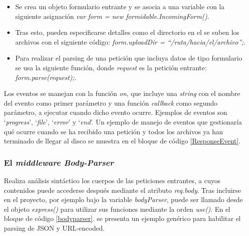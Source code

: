 \begin{itemize}
\item Se crea un objeto formulario entrante y se asocia a una variable con la siguiente asignación \emph{var form = new formidable.IncomingForm()}.
\item Tras esto, pueden especificarse detalles como el directorio en el se suben los archivos con el siguiente código:  \emph{form.uploadDir = ``/ruta/hacia/el/archivo'';}. 
\item Para realizar el parsing de una petición que incluya datos de tipo formulario se usa la siguiente función, donde \emph{request} es la petición entrante: \emph{form.parse(request);}.
\end{itemize}

Los eventos se manejan con la función \emph{on}, que incluye una \emph{string} con el nombre del evento como primer parámetro y una función \emph{callback} como segundo parámetro, a ejecutar cuando dicho evento ocurre. Ejemplos de eventos son ‘\emph{progress}’, ‘\emph{file}’, ‘\emph{error}’ y ‘\emph{end}’. Un ejemplo de manejo de eventos que gestionaría qué ocurre cuando se ha recibido una petición y todos los archivos ya han terminado de llegar al disco se muestra en el bloque de código \ref{ResponseEvent}.


\subsubsection{El \emph{middleware Body-Parser}}
Realiza análisis sintáctico los cuerpos de las peticiones entrantes, a cuyos contenidos puede accederse después mediante el atributo \emph{req.body}.
Tras incluirse en el proyecto, por ejemplo bajo la variable \emph{bodyParser}, puede ser llamado desde el objeto \emph{express()} para utilizar sus funciones mediante la orden \emph{use()}. En el bloque de código \ref{bodyparser}. se presenta un ejemplo genérico para habilitar el parsing de JSON y URL-encoded.

